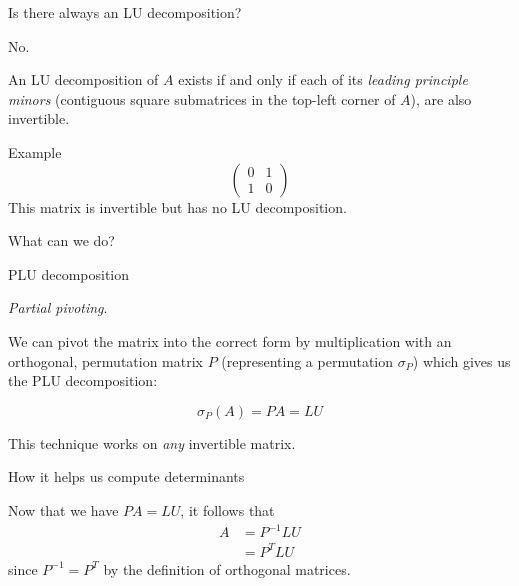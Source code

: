 \documentclass{beamer}
\begin{document}
\begin{frame}{Is there always an LU decomposition?}

    \alert{No.}

    An LU decomposition of $A$ exists if and only if each of its \emph{leading principle minors}
    (contiguous square submatrices in the top-left corner of $A$),
    are also invertible.

    \begin{exampleblock}{Example}
        \[
            \begin{pmatrix}{}
                0 & 1 \\
                1 & 0
            \end{pmatrix}
        \]
        This matrix is invertible but has no LU decomposition.
    \end{exampleblock}

    \begin{alertblock}{}
        What can we do?
    \end{alertblock}

\end{frame}

\begin{frame}{PLU decomposition}

    \emph{Partial pivoting}.

    We can pivot the matrix into the correct form by multiplication with
    an orthogonal, permutation matrix $P$ (representing a permutation $\sigma_P$)
    which gives us the PLU decomposition:

    \[
        \sigma_P(A) = PA = LU
    \]

    \begin{block}{}
        This technique works on \emph{any} invertible matrix.
    \end{block}

\end{frame}

\begin{frame}{How it helps us compute determinants}

    Now that we have $PA = LU$, it follows that
    \begin{align*}
        A &= P^{-1}LU \\
          &= P^T LU
    \end{align*}
    since $P^{-1} = P^T$ by the definition of orthogonal matrices.

\end{frame}
\end{document}
